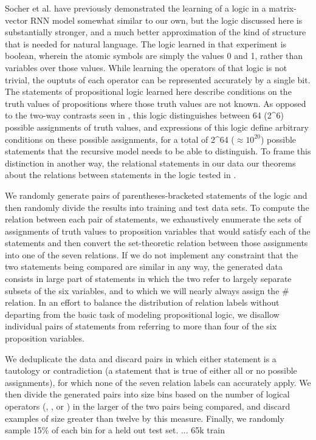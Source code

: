 
Socher et al. \cite{socher2012semantic} have previously demonstrated the learning of a logic in a matrix-vector RNN model somewhat similar to our own, but the logic discussed here is substantially stronger, and a much better approximation of the kind of structure that is needed for natural language. The logic learned in that experiment is boolean, wherein the atomic symbols are simply the values 0 and 1, rather than variables over those values. While learning the operators of that logic is not trivial, the ouptuts of each operator can be represented accurately by a single bit. The statements of propositional logic learned here describe conditions on the truth values of propositions where those truth values are not known. As opposed to the two-way contrasts seen in \cite{socher2012semantic}, this logic distinguishes between 64 (2^6) possible assignments of truth values, and expressions of this logic define arbitrary conditions on these possible assignments, for a total of 2^{64} ($\approx 10^{20}$) possible statements that the recursive model needs to be able to distinguish. To frame this distinction in another way, the relational statements in our data our theorems about the relations between statements in the logic tested in \cite{socher2012semantic}.

We randomly generate pairs of parentheses-bracketed statements of the logic and then randomly divide the results into training and test data sets. To compute the relation between each pair of statements, we exhaustively enumerate the sets of assignments of truth values to proposition variables that would satisfy each of the statements and then convert the set-theoretic relation between those assignments into one of the seven relations. 
If we do not implement any constraint that the two statements being compared are similar in any way, the generated data consists in large part of statements in which the two refer to largely separate subsets of the six variables, and to which we will nearly always assign the \# relation. In an effort to balance the distribution of relation labels without departing from the basic task of modeling propositional logic, we disallow individual pairs of statements from referring to more than four of the six proposition variables. 

We deduplicate the data and discard pairs in which either statement is a tautology or contradiction (a statement that is true of either all or no possible assignments), for which none of the seven relation labels can accurately apply. We then divide the generated pairs into size bins based on the number of logical operators (, , or ) in the larger of the two pairs being compared, and discard examples of size greater than twelve by this measure. Finally, we randomly sample 15\% of each bin for a held out test set.
...
65k train  

